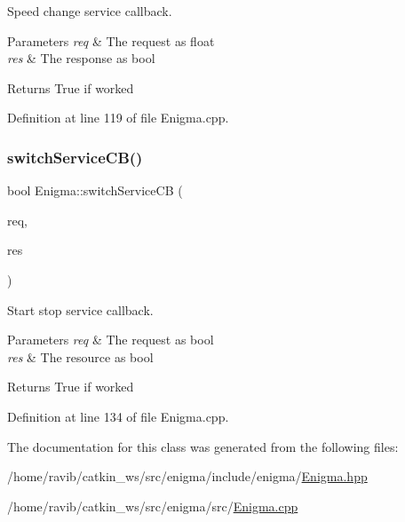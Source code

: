 Speed change service callback. 


\begin{DoxyParams}{Parameters}
{\em req} & The request as float \\
\hline
{\em res} & The response as bool\\
\hline
\end{DoxyParams}
\begin{DoxyReturn}{Returns}
True if worked 
\end{DoxyReturn}


Definition at line 119 of file Enigma.\+cpp.

\mbox{\label{class_enigma_a3ac35467cd1fd927e956ff351ed88e12}} 
\subsubsection{\texorpdfstring{switch\+Service\+C\+B()}{switchServiceCB()}}
{\footnotesize\ttfamily bool Enigma\+::switch\+Service\+CB (\begin{DoxyParamCaption}\item[{enigma\+::start\+Stop\+::\+Request \&}]{req,  }\item[{enigma\+::start\+Stop\+::\+Response \&}]{res }\end{DoxyParamCaption})}



Start stop service callback. 


\begin{DoxyParams}{Parameters}
{\em req} & The request as bool \\
\hline
{\em res} & The resource as bool\\
\hline
\end{DoxyParams}
\begin{DoxyReturn}{Returns}
True if worked 
\end{DoxyReturn}


Definition at line 134 of file Enigma.\+cpp.



The documentation for this class was generated from the following files\+:\begin{DoxyCompactItemize}
\item 
/home/ravib/catkin\+\_\+ws/src/enigma/include/enigma/\hyperlink{_enigma_8hpp}{Enigma.\+hpp}\item 
/home/ravib/catkin\+\_\+ws/src/enigma/src/\hyperlink{_enigma_8cpp}{Enigma.\+cpp}\end{DoxyCompactItemize}
